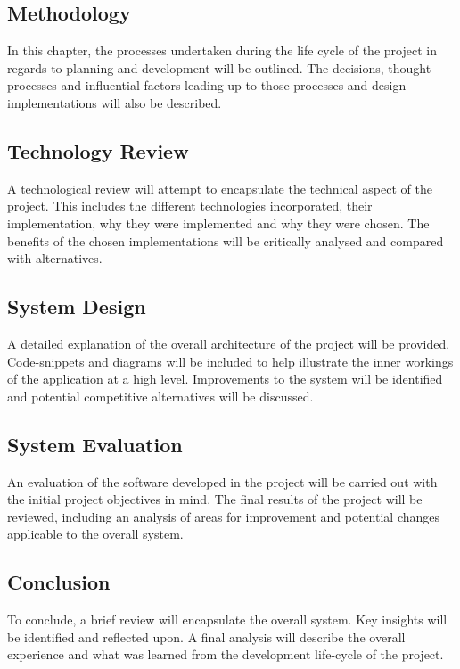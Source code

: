 \subsection{Methodology}
In this chapter, the processes undertaken during the life cycle of the project in regards to planning and development will be outlined. The decisions, thought processes and influential factors leading up to those processes and design implementations will also be described.
\subsection{Technology Review}
A technological review will attempt to encapsulate the technical aspect of the project. This includes the different technologies incorporated, their implementation, why they were implemented and why they were chosen. The benefits of the chosen implementations will be critically analysed and compared with alternatives.
\subsection{System Design}
A detailed explanation of the overall architecture of the project will be provided. Code-snippets and diagrams will be included to help illustrate the inner workings of the application at a high level. Improvements to the system will be identified and potential competitive alternatives will be discussed.
\subsection{System Evaluation}
An evaluation of the software developed in the project will be carried out with the initial project objectives in mind. The final results of the project will be reviewed, including an analysis of areas for improvement and potential changes applicable to the overall system.
\subsection{Conclusion}
To conclude, a brief review will encapsulate the overall system. Key insights will be identified and reflected upon. A final analysis will describe the overall experience and what was learned from the development life-cycle of the project.